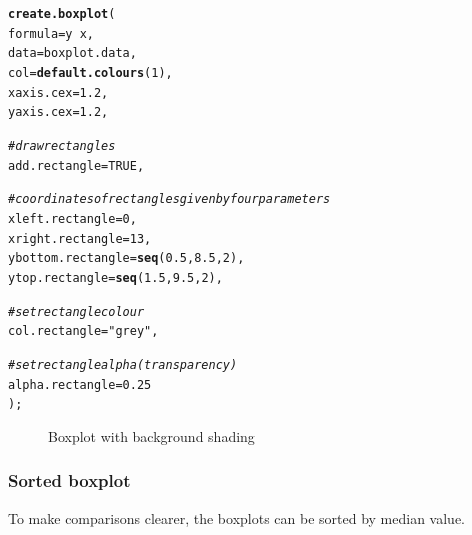 \documentclass[letterpaper]{report}\usepackage[]{graphicx}\usepackage[]{color}
\makeatletter
\newcommand{\hlnum}[1]{\textcolor[rgb]{0.686,0.059,0.569}{#1}}%
\newcommand{\hlstr}[1]{\textcolor[rgb]{0.192,0.494,0.8}{#1}}%
\newcommand{\hlcom}[1]{\textcolor[rgb]{0.678,0.584,0.686}{\textit{#1}}}%
\newcommand{\hlopt}[1]{\textcolor[rgb]{0,0,0}{#1}}%
\newcommand{\hlstd}[1]{\textcolor[rgb]{0.345,0.345,0.345}{#1}}%
\newcommand{\hlkwc}[1]{\textcolor[rgb]{0.333,0.667,0.333}{#1}}%
\newcommand{\hlkwd}[1]{\textcolor[rgb]{0.737,0.353,0.396}{\textbf{#1}}}%
\newenvironment{kframe}{%
 \def\at@end@of@kframe{}%
 \ifinner\ifhmode%
  \def\at@end@of@kframe{\end{minipage}}%
  \begin{minipage}{\columnwidth}%
 \fi\fi%
 \def\FrameCommand##1{\hskip\@totalleftmargin \hskip-\fboxsep
 \colorbox{shadecolor}{##1}\hskip-\fboxsep
     \hskip-\linewidth \hskip-\@totalleftmargin \hskip\columnwidth}%
 \MakeFramed {\advance\hsize-\width
   \@totalleftmargin\z@ \linewidth\hsize
   \@setminipage}}%
 {\par\unskip\endMakeFramed%
 \at@end@of@kframe}
\newenvironment{knitrout}{}{} %
\makeatother
\begin{document}
\begin{knitrout}
\color{fgcolor}\begin{kframe}
\begin{alltt}
\hlkwd{create.boxplot}\hlstd{(}
    \hlkwc{formula} \hlstd{= y} \hlopt{~} \hlstd{x,}
    \hlkwc{data} \hlstd{= boxplot.data,}
    \hlkwc{col} \hlstd{=} \hlkwd{default.colours}\hlstd{(}\hlnum{1}\hlstd{),}
    \hlkwc{xaxis.cex} \hlstd{=} \hlnum{1.2}\hlstd{,}
    \hlkwc{yaxis.cex} \hlstd{=} \hlnum{1.2}\hlstd{,}

    \hlcom{# draw rectangles}
    \hlkwc{add.rectangle} \hlstd{=} \hlnum{TRUE}\hlstd{,}

    \hlcom{# coordinates of rectangles given by four parameters}
    \hlkwc{xleft.rectangle} \hlstd{=} \hlnum{0}\hlstd{,}
    \hlkwc{xright.rectangle} \hlstd{=} \hlnum{13}\hlstd{,}
    \hlkwc{ybottom.rectangle} \hlstd{=} \hlkwd{seq}\hlstd{(}\hlnum{0.5}\hlstd{,} \hlnum{8.5}\hlstd{,} \hlnum{2}\hlstd{),}
    \hlkwc{ytop.rectangle} \hlstd{=} \hlkwd{seq}\hlstd{(}\hlnum{1.5}\hlstd{,} \hlnum{9.5}\hlstd{,} \hlnum{2}\hlstd{),}

    \hlcom{# set rectangle colour}
    \hlkwc{col.rectangle} \hlstd{=} \hlstr{"grey"}\hlstd{,}

    \hlcom{# set rectangle alpha (transparency)}
    \hlkwc{alpha.rectangle} \hlstd{=} \hlnum{0.25}
    \hlstd{);}
\end{alltt}
\end{kframe}\begin{figure}

{\centering {} 

}

\caption[Boxplot with background shading]{Boxplot with background shading}\label{fig:boxplot3}
\end{figure}


\end{knitrout}

\subsubsection{Sorted boxplot}
To make comparisons clearer, the boxplots can be sorted by median value.
\end{document}
